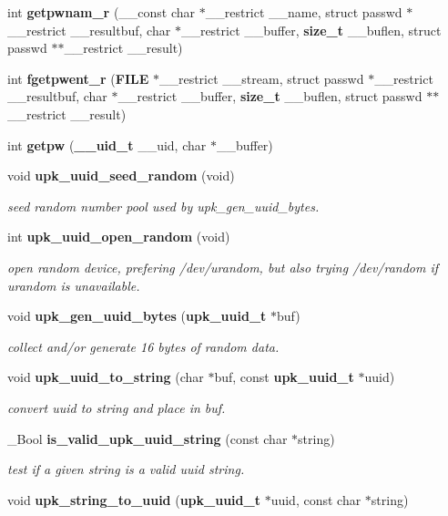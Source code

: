 \begin{DoxyCompactItemize}
\item 
int {\bf getpwnam\_\-r} (\_\-\_\-const char $\ast$\_\-\_\-restrict \_\-\_\-name, struct passwd $\ast$\_\-\_\-restrict \_\-\_\-resultbuf, char $\ast$\_\-\_\-restrict \_\-\_\-buffer, {\bf size\_\-t} \_\-\_\-buflen, struct passwd $\ast$$\ast$\_\-\_\-restrict \_\-\_\-result)
\item 
int {\bf fgetpwent\_\-r} ({\bf FILE} $\ast$\_\-\_\-restrict \_\-\_\-stream, struct passwd $\ast$\_\-\_\-restrict \_\-\_\-resultbuf, char $\ast$\_\-\_\-restrict \_\-\_\-buffer, {\bf size\_\-t} \_\-\_\-buflen, struct passwd $\ast$$\ast$\_\-\_\-restrict \_\-\_\-result)
\item 
int {\bf getpw} ({\bf \_\-\_\-uid\_\-t} \_\-\_\-uid, char $\ast$\_\-\_\-buffer)
\item 
void {\bf upk\_\-uuid\_\-seed\_\-random} (void)
\begin{DoxyCompactList}\small\item\em seed random number pool used by upk\_\-gen\_\-uuid\_\-bytes. \end{DoxyCompactList}\item 
int {\bf upk\_\-uuid\_\-open\_\-random} (void)
\begin{DoxyCompactList}\small\item\em open random device, prefering /dev/urandom, but also trying /dev/random if urandom is unavailable. \end{DoxyCompactList}\item 
void {\bf upk\_\-gen\_\-uuid\_\-bytes} ({\bf upk\_\-uuid\_\-t} $\ast$buf)
\begin{DoxyCompactList}\small\item\em collect and/or generate 16 bytes of random data. \end{DoxyCompactList}\item 
void {\bf upk\_\-uuid\_\-to\_\-string} (char $\ast$buf, const {\bf upk\_\-uuid\_\-t} $\ast$uuid)
\begin{DoxyCompactList}\small\item\em convert uuid to string and place in buf. \end{DoxyCompactList}\item 
\_\-Bool {\bf is\_\-valid\_\-upk\_\-uuid\_\-string} (const char $\ast$string)
\begin{DoxyCompactList}\small\item\em test if a given string is a valid uuid string. \end{DoxyCompactList}\item 
void {\bf upk\_\-string\_\-to\_\-uuid} ({\bf upk\_\-uuid\_\-t} $\ast$uuid, const char $\ast$string)

\end{DoxyCompactItemize}
